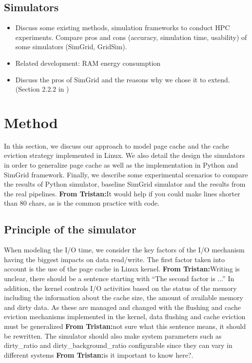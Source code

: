 \documentclass[conference]{IEEEtran}
\newcommand{\tristan}[1]{\color{orange}\textbf{From Tristan:}#1\color{black}}
\begin{document}
		\subsection{Simulators}
			\begin{itemize}
				\item Discuss some existing methods, simulation frameworks to conduct HPC experiments. Compare pros and cons (accuracy, simulation time, usability) of some simulators (SimGrid, GridSim).
				\item Related development: RAM energy consumption \cite{gill2019} \cite{ouarnoughi2017} 
				\item Discuss the pros of SimGrid and the reasons why we chose it to extend. (Section 2.2.2 in \cite{casanova2014})
			\end{itemize}
			
	\section{Method}
		In this section, we discuss our approach to model page cache and
		the cache eviction strategy implemented in Linux. We also detail
		the design the simulators in order to generalize page cache as well
		as the implementation in Python and SimGrid framework. Finally, we
		describe some experimental scenarios to compare the results of
		Python simulator, baseline SimGrid simulator and the results from
		the real pipelines. \tristan{It would help if you could make lines
		shorter than 80 chars, as is the common practice with code.}

		\subsection{Principle of the simulator}
	
			When modeling the I/O time, we consider the key factors of the
			I/O mechanism having the biggest impacts on data read/write.
			The first factor taken into account is the use of the page
			cache in Linux kernel. \tristan{Writing is unclear, there should be a sentence starting with ``The second factor is ...''} In addition, the kernel controls I/O
			activities based on the status of the memory including the
			information about the cache size, the amount of available
			memory and dirty data. As these are managed and changed with
			the flushing and cache eviction mechanisms implemented in the
			kernel, data flushing and cache eviction must be generalized \tristan{not sure what this sentence means, it should be rewritten}.
			The simulator should also make system parameters such as
			dirty{\_}ratio and dirty{\_}background{\_}ratio configurable
			since they can vary in different systems \tristan{is it important to know here?}.
			
\end{document}
